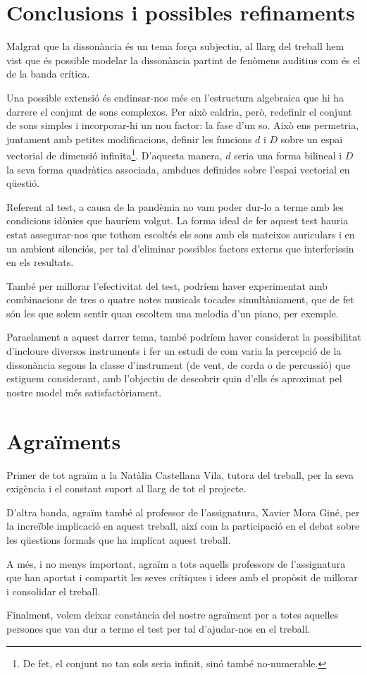 \documentclass{article}
\theoremstyle{math}
\theoremstyle{TheoremNum}
\newcommand{\0}{\ensuremath{\vb{0}}}
\begin{document}
\section{Conclusions i possibles refinaments}
Malgrat que la dissonància és un tema força subjectiu, al llarg del treball hem vist que és possible modelar la dissonància partint de fenòmens auditius com és el de la banda crítica.\par
Una possible extensió és endinsar-nos més en l'estructura algebraica que hi ha darrere el conjunt de sons complexos. Per això caldria, però, redefinir el conjunt de sons simples i incorporar-hi un nou factor: la fase d'un so. Això ens permetria, juntament amb petites modificacions, definir les funcions $d$ i $D$ sobre un espai vectorial de dimensió infinita\footnote{De fet, el conjunt no tan sols seria infinit, sinó també no-numerable.}. D'aquesta manera, $d$ seria una forma bilineal i $D$ la seva forma quadràtica associada, ambdues definides sobre l'espai vectorial en qüestió.\par
Referent al test, a causa de la pandèmia no vam poder dur-lo a terme amb les condicions idònies que hauríem volgut. La forma ideal de fer aquest test hauria estat assegurar-nos que tothom escoltés els sons amb els mateixos auriculars i en un ambient silenciós, per tal d'eliminar possibles factors externs que interferissin en els resultats.\par
També per millorar l'efectivitat del test, podríem haver experimentat amb combinacions de tres o quatre notes musicals tocades simultàniament, que de fet són les que solem sentir quan escoltem una melodia d'un piano, per exemple. \par Para\lgem elament a aquest darrer tema, també podríem haver considerat la possibilitat d'incloure diversos instruments i fer un estudi de com varia la percepció de la dissonància segons la classe d'instrument (de vent, de corda o de percussió) que estiguem considerant, amb l'objectiu de descobrir quin d'ells és aproximat pel nostre model més satisfactòriament.
\section{Agraïments}
Primer de tot agraïm a la Natàlia Castellana Vila, tutora del treball, per la seva exigència i el constant suport al llarg de tot el projecte. \par
D'altra banda, agraïm també al professor de l'assignatura, Xavier Mora Giné, per la increïble implicació en aquest treball, així com la participació en el debat sobre les qüestions formals que ha implicat aquest treball.\par
A més, i no menys important, agraïm a tots aquells professors de l'assignatura que han aportat i compartit les seves crítiques i idees amb el propòsit de millorar i consolidar el treball.\par
Finalment, volem deixar constància del nostre agraïment per a totes aquelles persones que van dur a terme el test per tal d'ajudar-nos en el treball.
\printbibliography[heading=bibintoc]
\appendix
\end{document}
